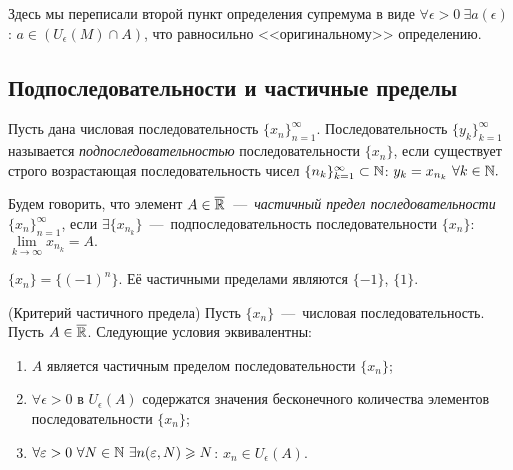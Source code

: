 \begin{note}
    Здесь мы переписали второй пункт определения супремума в виде $\forall \epsilon > 0 \ \exists a (\epsilon)$: $a \in \left( U_{\epsilon} (M) \cap A\right)$, что равносильно <<оригинальному>> определению.
\end{note}

\subsection{Подпоследовательности и частичные пределы}
\begin{definition}
    Пусть дана числовая последовательность $\{ x_{n} \}^{\infty}_{n = 1}.$ Последовательность $\{ y_{k} \}^{\infty}_{k = 1}$ называется \textit{подпоследовательностью} последовательности $\{ x_{n} \}$, если существует строго возрастающая последовательность чисел $\{ n_{k} \}^{\infty}_{k = 1} \subset \mathbb{N}$: $y_{k} = x_{n_{k}} \ \forall k \in \mathbb{N}.$
\end{definition}
\begin{definition}
    Будем говорить, что элемент $A \in \overline{\mathbb{R}}$~---~\textit{частичный предел последовательности} $\{ x_{n} \}^{\infty}_{n = 1}$, если $\exists \{ x_{n_{k}} \}$~---~подпоследовательность последовательности $\{ x_{n} \}$: $\lim\limits_{k\to \infty} x_{n_{k}} = A .$
\end{definition}
\begin{example}
    $\{ x_{n} \} = \{ (-1)^{n} \}.$ Её частичными пределами являются $\{ -1 \}$, $\{ 1 \}$.
\end{example}
\begin{theorem}
    (Критерий частичного предела) Пусть $\{ x_{n} \}$~---~числовая последовательность. Пусть $A \in \overline{\mathbb{R}}$. Следующие условия эквивалентны:
    \begin{enumerate}
        \item $A$ является частичным пределом последовательности $\{ x_{n} \}$;
        \item $\forall \epsilon > 0$ в $U_{\epsilon} (A)$ содержатся значения бесконечного количества элементов последовательности $\{ x_{n} \}$;
        \item  $\forall \varepsilon > 0 \  \forall N \in \mathbb{N} \  \exists n (\varepsilon, N) \geqslant N$: $x_{n} \in U_{\epsilon} (A).$
    \end{enumerate}
\end{theorem}
